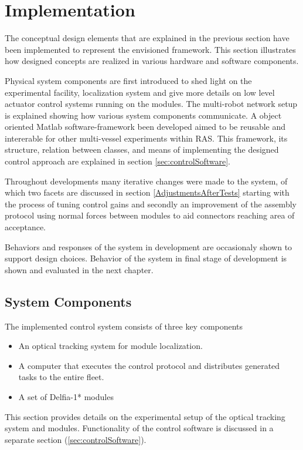 \section{Implementation} %
\label{chap:controlApproach}

The conceptual design elements that are explained in the previous section have been implemented to represent the envisioned framework. This section illustrates how designed concepts are realized in various hardware and software components. 

Physical system components are first introduced to shed light on the experimental facility, localization system and give more details on low level actuator control systems running on the modules. The multi-robot network setup is explained showing how various system components communicate. A object oriented Matlab software-framework been developed aimed to be reusable and intererable for other multi-vessel experiments within RAS. This framework, its structure, relation between classes, and means of implementing the designed control approach are explained in section \ref{sec:controlSoftware}.

Throughout developments many iterative changes were made to the system, of which two facets are discussed in section \ref{AdjustmentsAfterTests} starting with the process of tuning control gains and secondly an improvement of the assembly protocol using normal forces between modules to aid connectors reaching area of acceptance. 

Behaviors and responses of the system in development are occasionaly shown to support design choices. Behavior of the system in final stage of development is shown and evaluated in the next chapter. 

\subsection{System Components}
\label{imp:syscomponents}
The implemented control system consists of three key components
\begin{itemize}
	\item An optical tracking system for module localization.
	\item A computer that executes the control protocol and distributes generated tasks to the entire fleet.
	\item A set of Delfia-1* modules
\end{itemize}

This section provides details on the experimental setup of the optical tracking system and modules. Functionality of the control software is discussed in a separate section (\ref{sec:controlSoftware}). 

